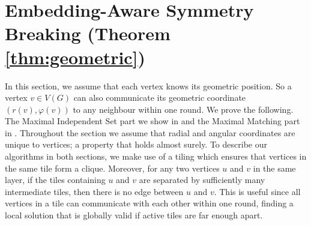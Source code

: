 \documentclass[letterpaper,11pt]{article}
\newcommand{\1}{\mathbb I}
\begin{document}
\section{Embedding-Aware Symmetry Breaking (Theorem \ref{thm:geometric})} \label{sec:geometric}
%
In this section, we assume that each vertex knows its geometric position. So a vertex $v \in V(G)$ can also communicate its geometric coordinate $(r(v), \varphi(v))$ to any neighbour within one round. We prove the following.
%
\theoremgeometric*
%
The Maximal Independent Set part we show in  and the Maximal Matching part in . Throughout the section we assume that radial and angular coordinates are unique to vertices; a property that holds almost surely.
%
To describe our algorithms in both sections, we make use of a tiling which ensures that vertices in the same tile form a clique. Moreover, for any two vertices $u$ and $v$ in the same layer, if the tiles containing $u$ and $v$ are separated by sufficiently many intermediate tiles, then there is no edge between $u$ and $v$.
 This is useful since all vertices in a tile can communicate with each other within one round, finding a local solution that is globally valid if active tiles are far enough apart.
\end{document}
